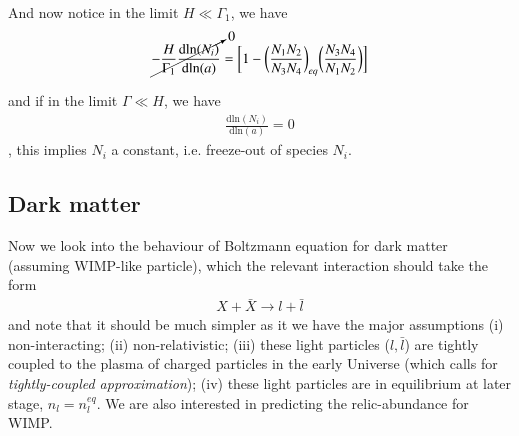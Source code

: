 \documentclass[a4paper, 12pt]{article}
\begin{document}
{{And now notice in the limit \( H \ll \Gamma_{1} \), 
we have 
\begin{align}
   \label{H << gamma}
  \cancelto{0}{- \frac{H}{\Gamma_1}  \frac{\mathrm{d}
  \mathrm{ln}(N_i)}{\mathrm{d}\mathrm{ln}(a)}}  = \bigg[ 1 -
  \bigg(\frac{N_1 N_2}{N_3 N_4} \bigg)_{eq} \bigg( \frac{N_3 N_4}{N_1
  N_2} \bigg)  \bigg] 
\end{align}

and if in the limit \( \Gamma \ll H  \),
we have
\begin{align}
  \label{gamma << H}
  \frac{\mathrm{d}
  \mathrm{ln}(N_i)}{\mathrm{d}\mathrm{ln}(a)} = 0
\end{align}, this implies \( N_i \) a constant, i.e. freeze-out of species
\( N_i \).

\subsection{Dark matter}%
  \label{sub:Dark matter}
  Now we look into the behaviour of Boltzmann equation for dark matter
  (assuming WIMP-like particle), which the relevant interaction should
  take the form 
  \begin{align}
    \label{WIMP interaction}
    X + \bar{X} \to l + \bar{l}
  \end{align}
  and note that it should be much simpler as it we have the major
  assumptions (i) non-interacting; (ii) non-relativistic; (iii) these
  light particles (\( l, \bar{l} \)) are tightly coupled to the plasma of
  charged particles in the early Universe (which calls for
  \textit{tightly-coupled approximation}); (iv) these light particles
  are in equilibrium at later stage, \( n_l = n_{l}^{eq} \). We are also
  interested in predicting the relic-abundance for WIMP. 

}}
\end{document}
